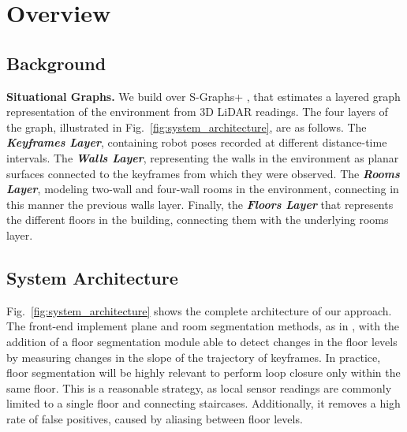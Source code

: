\section{Overview}
\label{overview}


\subsection{Background}

\textbf{Situational Graphs.} We build over S-Graphs+ \cite{s_graphs+}, that estimates a layered graph representation of the environment from 3D LiDAR readings. The four layers of the graph, illustrated in Fig.~\ref{fig:system_architecture}, are as follows. The \textbf{\textit{Keyframes Layer}},  containing robot poses recorded at different distance-time intervals. The \textbf{\textit{Walls Layer}},  representing the walls in the environment as planar surfaces connected to the keyframes from which they were observed. The \textbf{\textit{Rooms Layer}}, modeling two-wall and four-wall rooms in the environment, connecting in this manner the previous walls layer. Finally, the \textbf{\textit{Floors Layer}} that represents the different floors in the building, connecting them with the underlying rooms layer.  

\subsection{System Architecture} \label{subsec:system_architecture}
Fig.~\ref{fig:system_architecture} shows the complete architecture of our approach. The front-end implement plane and room segmentation methods, as in \cite{s_graphs+}, with the addition of a floor segmentation module able to detect changes in the floor levels by measuring changes in the slope of the trajectory of keyframes. In practice, floor segmentation will be highly relevant to perform loop closure only within the same floor. This is a reasonable strategy, as local sensor readings are commonly limited to a single floor and connecting staircases. Additionally, it removes a high rate of false positives, caused by aliasing between floor levels.

